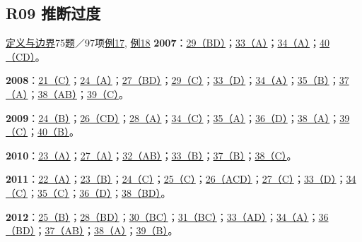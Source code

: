 \documentclass[11pt,a4paper]{article}
\begin{document}
\subsection{R09 推断过度}\label{class-R09}
\noindent \hyperref[cat-R09]{定义与边界}\quad 75题／97项\quad \hyperref[case-2009-T3-Q34]{例17}, \hyperref[case-2015-T1-Q24]{例18}
\noindent\textbf{2007}：\hyperref[idx-2007-T2-Q29]{29（BD）}；\hyperref[idx-2007-T3-Q33]{33（A）}；\hyperref[idx-2007-T3-Q34]{34（A）}；\hyperref[idx-2007-T4-Q40]{40（CD）}。\par
\noindent\textbf{2008}：\hyperref[idx-2008-T1-Q21]{21（C）}；\hyperref[idx-2008-T1-Q24]{24（A）}；\hyperref[idx-2008-T2-Q27]{27（BD）}；\hyperref[idx-2008-T2-Q29]{29（C）}；\hyperref[idx-2008-T3-Q33]{33（D）}；\hyperref[idx-2008-T3-Q34]{34（A）}；\hyperref[idx-2008-T3-Q35]{35（B）}；\hyperref[idx-2008-T4-Q37]{37（A）}；\hyperref[idx-2008-T4-Q38]{38（AB）}；\hyperref[idx-2008-T4-Q39]{39（C）}。\par
\noindent\textbf{2009}：\hyperref[idx-2009-T1-Q24]{24（B）}；\hyperref[idx-2009-T2-Q26]{26（CD）}；\hyperref[idx-2009-T2-Q28]{28（A）}；\hyperref[idx-2009-T3-Q34]{34（C）}；\hyperref[idx-2009-T3-Q35]{35（A）}；\hyperref[idx-2009-T4-Q36]{36（D）}；\hyperref[idx-2009-T4-Q38]{38（A）}；\hyperref[idx-2009-T4-Q39]{39（C）}；\hyperref[idx-2009-T4-Q40]{40（B）}。\par
\noindent\textbf{2010}：\hyperref[idx-2010-T1-Q23]{23（A）}；\hyperref[idx-2010-T2-Q27]{27（A）}；\hyperref[idx-2010-T3-Q32]{32（AB）}；\hyperref[idx-2010-T3-Q33]{33（B）}；\hyperref[idx-2010-T4-Q37]{37（B）}；\hyperref[idx-2010-T4-Q38]{38（C）}。\par
\noindent\textbf{2011}：\hyperref[idx-2011-T1-Q22]{22（A）}；\hyperref[idx-2011-T1-Q23]{23（B）}；\hyperref[idx-2011-T1-Q24]{24（C）}；\hyperref[idx-2011-T1-Q25]{25（C）}；\hyperref[idx-2011-T2-Q26]{26（ACD）}；\hyperref[idx-2011-T2-Q27]{27（C）}；\hyperref[idx-2011-T3-Q33]{33（D）}；\hyperref[idx-2011-T3-Q34]{34（C）}；\hyperref[idx-2011-T3-Q35]{35（C）}；\hyperref[idx-2011-T4-Q36]{36（D）}；\hyperref[idx-2011-T4-Q38]{38（BD）}。\par
\noindent\textbf{2012}：\hyperref[idx-2012-T1-Q25]{25（B）}；\hyperref[idx-2012-T2-Q28]{28（BD）}；\hyperref[idx-2012-T2-Q30]{30（BC）}；\hyperref[idx-2012-T3-Q31]{31（BC）}；\hyperref[idx-2012-T3-Q33]{33（AD）}；\hyperref[idx-2012-T3-Q34]{34（A）}；\hyperref[idx-2012-T4-Q36]{36（BD）}；\hyperref[idx-2012-T4-Q37]{37（AB）}；\hyperref[idx-2012-T4-Q38]{38（A）}；\hyperref[idx-2012-T4-Q39]{39（B）}。\par
\end{document}
